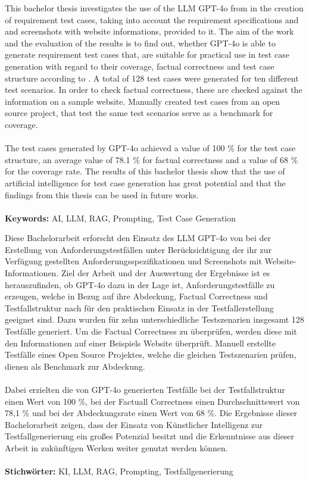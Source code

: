 \documentclass[12pt,toc=bib,toc=listof]{scrreprt}
\begin{document}
\label{sec:abstract}
This bachelor thesis investigates the use of the LLM GPT-4o from \textcite{OpenAI2025} in the creation of requirement test cases, taking into account the requirement specifications and and screenshots with website informations, provided to it. The aim of the work and the evaluation of the results is to find out, whether GPT-4o is able to generate requirement test cases that, are suitable for practical use in test case generation with regard to their coverage, factual correctness and test case structure according to
\textcite{IsoIecIeee2024}. A total of 128 test cases were generated for ten different test scenarios. In order to check factual correctness, these are checked against the information on a sample website. Manually created test cases from an open source project, that test the same test scenarios serve as a benchmark for coverage.\\
\\
The test cases generated by GPT-4o achieved a value of 100 \% for the test case structure, an average value of 78.1 \% for factual correctness and a value of 68 \% for the coverage rate. The results of this bachelor thesis show that the use of artificial intelligence for test case generation has great potential and that the findings from this thesis can be used in future works.\\
\\
\textbf{Keywords:} AI, LLM, RAG, Prompting, Test Case Generation
\newpage

\label{sec:zusammenfassung}
Diese Bachelorarbeit erforscht den Einsatz des LLM GPT-4o von \textcite{OpenAI2025} bei der Erstellung von Anforderungstestfällen unter Berücksichtigung der ihr zur Verfügung gestellten Anforderungsspezifikationen und Screenshots mit Website-Informationen. Ziel der Arbeit und der Auswertung der Ergebnisse ist es herauszufinden, ob GPT-4o dazu in der Lage ist, Anforderungstestfälle zu erzeugen, welche in Bezug auf ihre Abdeckung, Factual Correctness und Testfallstruktur nach \textcite{IsoIecIeee2024} für den praktischen Einsatz in der Testfallerstellung geeignet sind. Dazu wurden für zehn unterschiedliche Testszenarien insgesamt 128 Testfälle generiert. Um die Factual Correctness zu überprüfen, werden diese mit den Informationen auf einer Beispiels Website überprüft. Manuell erstellte Testfälle eines Open Source Projektes, welche die gleichen Testszenarien prüfen, dienen als Benchmark zur Abdeckung.\\
\\
Dabei erzielten die von GPT-4o generierten Testfälle bei der Testfallstruktur einen Wert von 100 \%, bei der Factuall Correctness einen Durchschnittswert von 78,1 \% und bei der Abdeckungsrate einen Wert von 68 \%. Die Ergebnisse dieser Bachelorarbeit zeigen, dass der Einsatz von Künstlicher Intelligenz zur Testfallgenerierung ein großes Potenzial besitzt und die Erkenntnisse aus dieser Arbeit  in zukünftigen Werken weiter genutzt werden können.\\
\\
\textbf{Stichwörter:} KI, LLM, RAG, Prompting, Testfallgenerierung
\end{document}
